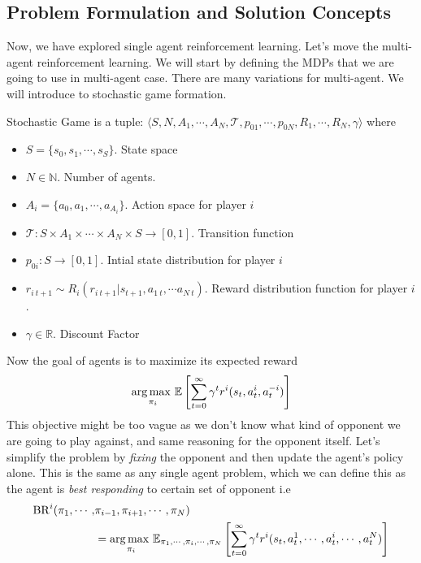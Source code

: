 \label{sec:chap2-multi-agent-rl}

\subsection{Problem Formulation and Solution Concepts}
\label{sec:chap2-formulation-concepts}
Now, we have explored single agent reinforcement learning. Let's move the multi-agent reinforcement learning. We will start by defining the MDPs that we are going to use in multi-agent case. There are many variations for multi-agent. We will introduce to stochastic game \cite{shapley1953stochastic} formation. 
\begin{definition}
Stochastic Game is a tuple: $\langle S, N, A_1, \cdots, A_N, \mathcal{T}, p_{01}, \cdots, p_{0N}, R_1, \cdots, R_N, \gamma \rangle$ where 
\begin{itemize}
    \item $S = \{s_0, s_1, \cdots , s_S\}$. State space 
    \item $N \in \mathbb{N}$. Number of agents. 
    \item $A_i = \{a_0, a_1, \cdots, a_{A_i}\}$. Action space for player $i$
    \item $\mathcal{T} : S \times A_1 \times \cdots \times A_N \times S \rightarrow [0, 1]$. Transition function 
    \item $p_{0i}: S \rightarrow [0, 1]$. Intial state distribution for player $i$
    \item $r_{i \ t+1} \sim R_i(r_{i \ t+1} | s_{t+1}, a_{1 \ t}, \cdots a_{N \ t})$. Reward distribution function for player $i$.
    \item $\gamma \in \mathbb{R}$. Discount Factor 
\end{itemize}
\end{definition}
\noindent
Now the goal of agents is to maximize its expected reward
\begin{equation}
    \underset{\pi_i}{\arg\max \ } \mathbb{E}\left[ \sum^\infty_{t=0} \gamma ^t r^i(s_t, a^i_t, a^{-i}_t)  \right] 
\end{equation}
This objective might be too vague as we don't know what kind of opponent we are going to play against, and same reasoning for the opponent itself. Let's simplify the problem by \textit{fixing} the opponent and then update the agent's policy alone. This is the same as any single agent problem, which we can define this as the agent is \textit{best responding} to certain set of opponent i.e 
\begin{equation}
\begin{aligned}
    \operatorname{BR}^i(\pi_1, \cdots, &\pi_{i-1}, \pi_{i+1}, \cdots, \pi_N) \\
    &= \underset{\pi_i}{\arg\max \ } \mathbb{E}_{\pi_1, \cdots , \pi_i, \cdots, \pi_N}\left[ \sum^\infty_{t=0} \gamma ^t r^i(s_t, a^1_t, \cdots, a^i_t, \cdots, a^{N}_t)  \right]
\end{aligned}
\end{equation}
